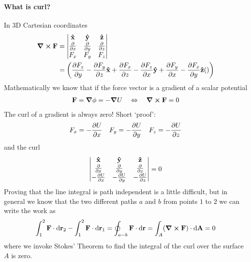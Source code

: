 \documentclass[../main.tex]{subfiles}
\begin{document}
\paragraph{What is curl?} In 3D Cartesian coordinates
\begin{align*}
    \curl{\vb F} &= \mqty| \vu{x} & \vu{y} & \vu z \\
                        \pdv{x} & \pdv{y} & \pdv{z} \\
                        F_x & F_y & F_z | \\
    &= \qt(\pdv{F_z}{y} - \pdv{F_y}{z}\vu{x} + \pdv{F_x}{z} - \pdv{F_z}{x}\vu{y} +
    \pdv{F_y}{x} - \pdv{F_x}{y}\vu{z}\qt)
\end{align*}
Mathematically we know that if the force vector is a gradient of a scalar potential
\begin{align*}
    \vb{F} = \grad{\phi} = - \grad{U} \quad \Leftrightarrow \quad \curl{\vb{F}} = 0
\end{align*}
The curl of a gradient is always zero! Short `proof':
\begin{align*}
    F_x = -\pdv{U}{x} \quad F_y = -\pdv{U}{y} \quad F_z = -\pdv{U}{z}
\end{align*}
and the curl
\begin{align*}
    \mqty| \vu{x} & \vu{y} & \vu z \\
    \pdv{x} & \pdv{y} & \pdv{z} \\
    -\pdv{U}{x} & -\pdv{U}{y} & -\pdv{U}{z} | = 0
\end{align*}
Proving that the line integral is path independent is a little difficult, but in general we know
that the two different paths $a$ and $b$ from points $1$ to $2$ we can write the work as
\begin{align*}
    \int_1^2 \vb{F} \cdot \dd{\vb{r}_2} - \int_1^2 \vb{F} \cdot \dd{\vb{r}_1} 
    = \oint_{a-b} \vb{F} \cdot \dd{\vb{r}} = \int_A (\curl \vb{F}) \cdot \dd{\vb{A}} = 0
\end{align*}
where we invoke Stokes' Theorem to find the integral of the curl over the surface $A$ is zero.
\end{document}
